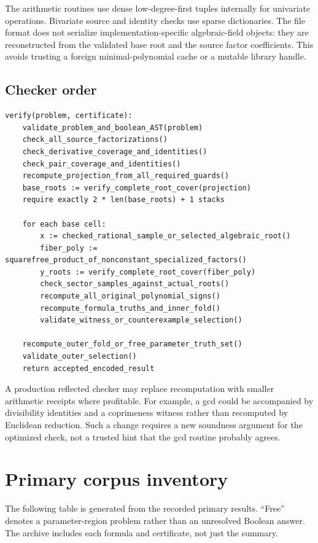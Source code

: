 The arithmetic routines use dense low-degree-first tuples internally for univariate operations. Bivariate source and identity checks use sparse dictionaries. The file format does not serialize implementation-specific algebraic-field objects: they are reconstructed from the validated base root and the source factor coefficients. This avoids trusting a foreign minimal-polynomial cache or a mutable library handle.

\subsection{Checker order}
\begin{lstlisting}
verify(problem, certificate):
    validate_problem_and_boolean_AST(problem)
    check_all_source_factorizations()
    check_derivative_coverage_and_identities()
    check_pair_coverage_and_identities()
    recompute_projection_from_all_required_guards()
    base_roots := verify_complete_root_cover(projection)
    require exactly 2 * len(base_roots) + 1 stacks

    for each base cell:
        x := checked_rational_sample_or_selected_algebraic_root()
        fiber_poly := squarefree_product_of_nonconstant_specialized_factors()
        y_roots := verify_complete_root_cover(fiber_poly)
        check_sector_samples_against_actual_roots()
        recompute_all_original_polynomial_signs()
        recompute_formula_truths_and_inner_fold()
        validate_witness_or_counterexample_selection()

    recompute_outer_fold_or_free_parameter_truth_set()
    validate_outer_selection()
    return accepted_encoded_result
\end{lstlisting}

A production reflected checker may replace recomputation with smaller arithmetic receipts where profitable. For example, a gcd could be accompanied by divisibility identities and a coprimeness witness rather than recomputed by Euclidean reduction. Such a change requires a new soundness argument for the optimized check, not a trusted hint that the gcd routine probably agrees.

\section{Primary corpus inventory}
The following table is generated from the recorded primary results. ``Free'' denotes a parameter-region problem rather than an unresolved Boolean answer. The archive includes each formula and certificate, not just the summary.


